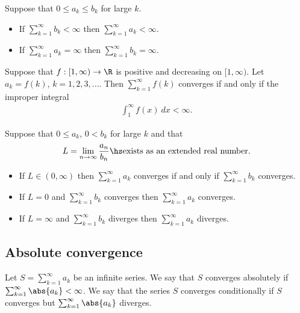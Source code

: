 \documentclass{article}
\begin{document}
\begin{theorem}
    Suppose that $0\leq a_k\leq b_k$ for large $k$.
    \begin{itemize}
        \item If $\sum_{k=1}^\infty b_k<\infty$ then $\sum_{k=1}^\infty a_k < \infty$.
        \item If $\sum_{k=1}^\infty a_k = \infty$ then $\sum_{k=1}^\infty b_k = \infty$.
    \end{itemize} 
\end{theorem}

\begin{theorem}
    Suppose that $f:[1,\infty)\to\R$ is positive and decreasing on
    $[1,\infty)$. Let $a_k=f(k)$, $k=1,2,3,...$. Then $\sum_{k=1}^\infty f(k)$
    converges if and only if the improper integral
    \begin{align*}
        \int_1^\infty f(x)\:dx < \infty.
    \end{align*}
\end{theorem}

\setcounter{theorem}{6}
\begin{theorem}
    Suppose that $0\leq a_k$, $0<b_k$ for large $k$ and that  
    \begin{align*}
        L=\lim_{n\to\infty}\frac{a_n}{b_n}\hs\text{exists as an extended real number}.
    \end{align*}
    \begin{itemize}
        \item If $L\in(0,\infty)$ then $\sum_{k=1}^\infty a_k$ converges if and only if $\sum_{k=1}^\infty b_k$ converges.
        \item If $L=0$ and $\sum_{k=1}^\infty b_k$ converges then $\sum_{k=1}^\infty a_k$ converges.
        \item If $L=\infty$ and $\sum_{k=1}^\infty b_k$ diverges then $\sum_{k=1}^\infty a_k$ diverges.
    \end{itemize}
\end{theorem}

\subsection{Absolute convergence}

\begin{definition}
    Let $S=\sum_{k=1}^\infty a_k$ be an infinite series. We say that $S$ converges
    absolutely if $\sum_{k=1}^\infty \abs{a_k}<\infty$. We say that the series
    $S$ converges conditionally if $S$ converges but $\sum_{k=1}^\infty\abs{a_k}$ 
    diverges.
\end{definition}
\end{document}
